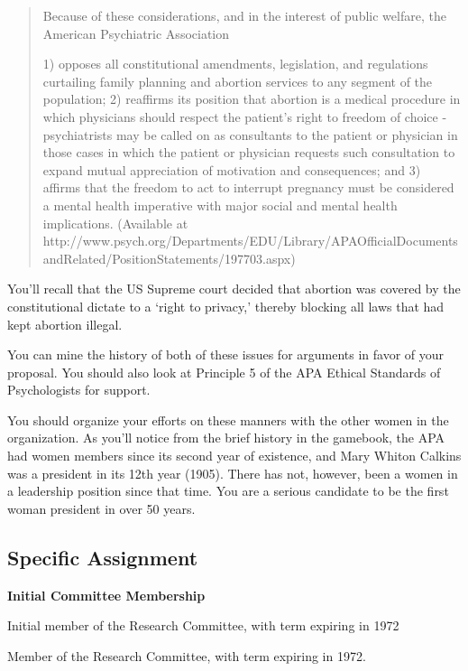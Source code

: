\begin{refsection}
\begin{quote}
Because of these considerations, and in the interest of public welfare, the American Psychiatric Association

1) opposes all constitutional amendments, legislation, and regulations curtailing family planning and abortion services to any segment of the population; 2) reaffirms its position that abortion is a medical procedure in which physicians should respect the patient's right to freedom of choice - psychiatrists may be called on as consultants to the patient or physician in those cases in which the patient or physician requests such consultation to expand mutual appreciation of motivation and consequences; and 3) affirms that the freedom to act to interrupt pregnancy must be considered a mental health imperative with major social and mental health implications.⁠ (Available at http:\slash \slash www.psych.org\slash Departments\slash EDU\slash Library\slash APAOfficialDocumentsandRelated\slash PositionStatements\slash 197703.aspx)
\end{quote}

You'll recall that the US Supreme court decided that abortion was covered by the constitutional dictate to a `right to privacy,' thereby blocking all laws that had kept abortion illegal.

You can mine the history of both of these issues for arguments in favor of your proposal. You should also look at Principle 5 of the APA Ethical Standards of Psychologists for support.

You should organize your efforts on these manners with the other women in the organization. As you'll notice from the brief history in the gamebook, the APA had women members since its second year of existence, and Mary Whiton Calkins was a president in its 12th year (1905). There has not, however, been a women in a leadership position since that time. You are a serious candidate to be the first woman president in over 50 years.

\subsection{Specific Assignment}
\label{specificassignment}

\textbf{Initial Committee Membership}
\begin{service}[Tyler]\label{service:tyler}
Initial member of the Research Committee, with term expiring in 1972
\end{service}

Member of the Research Committee, with term expiring in 1972.


\end{refsection}
